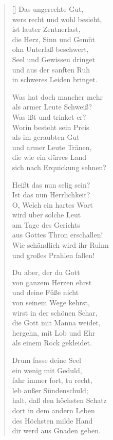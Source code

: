 \begin{multicols}{2}
\begin{verse}[\versewidth]
   Das ungerechte Gut,\\
  wers recht und wohl besieht,\\
  ist lauter Zentnerlast,\\
  die Herz, Sinn und Gemüt\\
  ohn Unterlaß beschwert,\\
  Seel und Gewissen dringet\\
  und aus der sanften Ruh\\
  in schweres Leiden bringet.

   Was hat doch mancher mehr\\
  als armer Leute Schweiß?\\
  Was ißt und trinket er?\\
  Worin besteht sein Preis\\
  als im geraubten Gut\\
  und armer Leute Tränen,\\
  die wie ein dürres Land\\
  sich nach Erquickung sehnen?

   Heißt das nun selig sein?\\
  Ist das nun Herrlichkeit?\\
  O, Welch ein hartes Wort\\
  wird über solche Leut\\
  am Tage des Gerichts\\
  aus Gottes Thron erschallen!\\
  Wie schändlich wird ihr Ruhm\\
  und großes Prahlen fallen!

\vfill\null
\columnbreak

   Du aber, der du Gott\\
  von ganzem Herzen ehrst\\
  und deine Füße nicht\\
  von seinem Wege kehrst,\\
  wirst in der schönen Schar,\\
  die Gott mit Manna weidet,\\
  hergehn, mit Lob und Ehr\\
  als einem Rock gekleidet.

   Drum fasse deine Seel\\
  ein wenig mit Geduld,\\
  fahr immer fort, tu recht,\\
  leb außer Sündenschuld;\\
  halt, daß den höchsten Schatz\\
  dort in dem andern Leben\\
  des Höchsten milde Hand\\
  dir werd aus Gnaden geben.

\end{verse}
\end{multicols}


